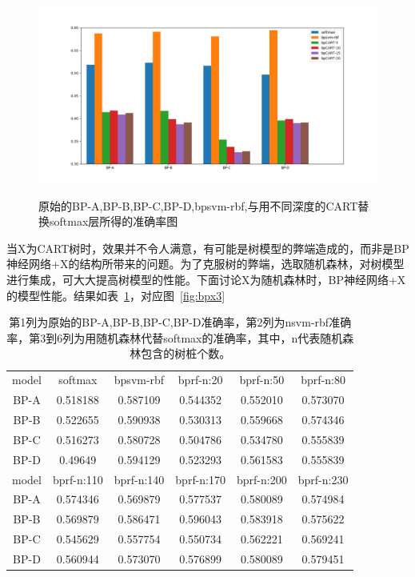 \begin{figure}[htb]
\centering
\includegraphics[scale=0.5]{../figures/NN_tree1.png} \\
\caption{原始的BP-A,BP-B,BP-C,BP-D,bpsvm-rbf,与用不同深度的CART替换softmax层所得的准确率图}
\label{fig:bpx2}
\end{figure}

当X为CART树时，效果并不令人满意，有可能是树模型的弊端造成的，而非是BP神经网络+X的结构所带来的问题。为了克服树的弊端，选取随机森林，对树模型进行集成，可大大提高树模型的性能。下面讨论X为随机森林时，BP神经网络+X的模型性能。结果如表~\ref{table:bpx5}，对应图~\ref{fig:bpx3}

\begin{table}[htb]
\centering
\caption{第1列为原始的BP-A,BP-B,BP-C,BP-D准确率，第2列为nsvm-rbf准确率，第3到6列为用随机森林代替softmax的准确率，其中，n代表随机森林包含的树桩个数。}
\begin{tabular}{cccccc}
\toprule[2pt]
model & softmax & bpsvm-rbf & bprf-n:20 & bprf-n:50 & bprf-n:80 \\ 
BP-A & 0.518188 & 0.587109 & 0.544352 & 0.552010 & 0.573070 \\ 
BP-B & 0.522655 & 0.590938 & 0.530313 & 0.559668 & 0.574346 \\ 
BP-C & 0.516273 & 0.580728 & 0.504786 & 0.534780 & 0.555839 \\  
BP-D & 0.49649 & 0.594129 & 0.523293 & 0.561583 & 0.555839 \\ 
\midrule[2pt]
model & bprf-n:110 & bprf-n:140 & bprf-n:170 & bprf-n:200 & bprf-n:230 \\ 
BP-A & 0.574346 & 0.569879 & 0.577537 & 0.580089 & 0.574984 \\ 
BP-B & 0.569879 & 0.586471 & 0.596043 & 0.583918 & 0.575622 \\ 
BP-C & 0.545629 & 0.557754 & 0.550734 & 0.562221 & 0.569241 \\ 
BP-D & 0.560944 & 0.573070 & 0.576899 & 0.580089 & 0.579451 \\ 
\bottomrule[2pt]
\end{tabular} 
\label{table:bpx5}
\end{table}

